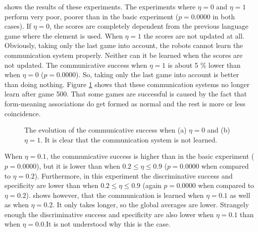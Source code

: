  shows the results of these experiments. The experiments where $\eta=0$ and $\eta=1$ perform very poor, poorer than in the basic experiment ($p=0.0000$ in both cases). If $\eta=0$, the scores are completely dependent from the previous language game where the element is used. When $\eta=1$ the scores are not updated at all. Obviously, taking only the last game into account, the robots cannot learn the communication system properly. Neither can it be learned when the scores are not updated. The communicative success when $\eta=1$ is about 5 \% lower than when $\eta=0$ ($p=0.0000$). So, taking only the last game into account is better than doing nothing. Figure \ref{f:lex:csA0} shows that these communication systems no longer learn after game 500. That some games are successful is caused by the fact that form-meaning associations do get formed as normal and the rest is more or less coincidence.

\begin{figure}[t]
\centering
{}
\caption{The evolution of the communicative success when (a) $\eta=0$ and (b) $\eta=1$. It is clear that the communication system is not learned.}
\label{f:lex:csA0}
\end{figure}

When $\eta=0.1$, the communicative success is higher than in the basic experiment ($p=0.0000$), but it is lower than when $0.2\leq\eta\leq0.9$ ($p=0.0000$ when compared to $\eta=0.2$). Furthermore, in this experiment the discriminative success and specificity are lower than when $0.2\leq\eta\leq0.9$ (again $p=0.0000$ when compared to $\eta=0.2$).  shows however, that the communication is learned when $\eta=0.1$ as well as when $\eta=0.2$. It only takes longer, so the global averages are lower. Strangely enough the discriminative success and specificity are also lower when $\eta=0.1$ than when $\eta=0.0$.It is not understood why this is the case.

